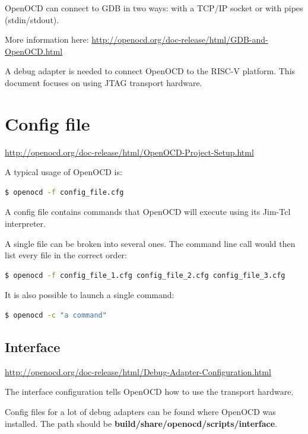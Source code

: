 \documentclass{article}
\begin{document}
	OpenOCD can connect to GDB in two ways: with a TCP/IP socket or with pipes (stdin/stdout). 
	
	More information here: \url{http://openocd.org/doc-release/html/GDB-and-OpenOCD.html}
	
	A debug adapter is needed to connect OpenOCD to the RISC-V platform. This document focuses on using JTAG transport hardware.
	
	\newpage
	\section{Config file}
	
	\url{http://openocd.org/doc-release/html/OpenOCD-Project-Setup.html}
	
	A typical usage of OpenOCD is:
	
	\begin{lstlisting}[language=bash]
    $ openocd -f config_file.cfg
    \end{lstlisting}
    
    A config file contains commands that OpenOCD will execute using its Jim-Tcl interpreter.
    
    A single file can be broken into several ones. The command line call would then list every file in the correct order:
    
    \begin{lstlisting}[language=bash]
    $ openocd -f config_file_1.cfg config_file_2.cfg config_file_3.cfg
    \end{lstlisting}
    
    It is also possible to launch a single command:
    
    \begin{lstlisting}[language=bash]
    $ openocd -c "a command"
    \end{lstlisting}
    
    \subsection{Interface}
    
    \url{http://openocd.org/doc-release/html/Debug-Adapter-Configuration.html}
    
    The interface configuration tells OpenOCD how to use the transport hardware. 
    
    Config files for a lot of debug adapters can be found where OpenOCD was installed. The path should be \textbf{build/share/openocd/scripts/interface}.
    
\end{document}
